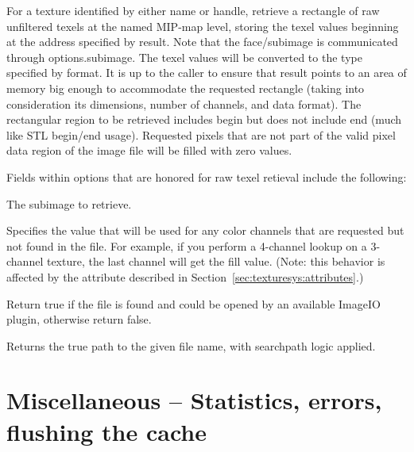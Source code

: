 For a texture identified by either name or handle,
retrieve a rectangle of raw unfiltered texels at the named MIP-map level, storing
the texel values beginning at the address specified by result.
Note that the face/subimage is communicated through {\kw options.subimage}.
The texel values will be converted to the type specified by
format.  It is up to the caller to ensure that result points to
an area of memory big enough to accommodate the requested
rectangle (taking into consideration its dimensions, number of
channels, and data format).  The rectangular region to be
retrieved includes {\cf begin} but does not include {\cf end} (much
like STL begin/end usage).
Requested pixels that are not part of the valid pixel data region of the
image file will be filled with zero values.

Fields within {\cf options} that are honored for raw texel retieval
include the following:

\vspace{-12pt}
\vspace{10pt}
The subimage to retrieve.
\apiend


\vspace{-24pt}
\vspace{10pt}
Specifies the value that will be used for any color channels that are
requested but not found in the file.  For example, if you perform a
4-channel lookup on a 3-channel texture, the last channel will
get the fill value.  (Note: this behavior is affected by the
 attribute described in 
Section~\ref{sec:texturesys:attributes}.)
\apiend

Return true if the file is found and could be opened by an
available ImageIO plugin, otherwise return false.

\apiend

Returns the true path to the given file name, with searchpath logic
applied.
\apiend

\section{Miscellaneous -- Statistics, errors, flushing the cache}
\label{sec:texturesys:api:geterror}
\label{sec:texturesys:api:getstats}
\label{sec:texturesys:api:resetstats}
\label{sec:texturesys:api:invalidate}

